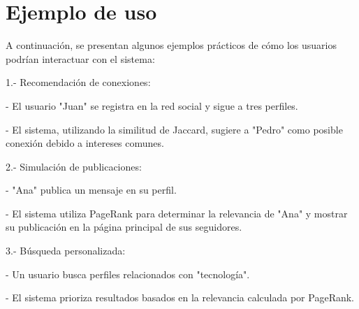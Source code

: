 \section{Ejemplo de uso}
A continuación, se presentan algunos ejemplos prácticos de cómo los usuarios podrían interactuar con el sistema:

1.- Recomendación de conexiones:

\hspace{1cm}- El usuario "Juan" se registra en la red social y sigue a tres perfiles.

\hspace{1cm}- El sistema, utilizando la similitud de Jaccard, sugiere a "Pedro" como posible conexión debido a intereses comunes.

2.- Simulación de publicaciones:

\hspace{1cm}- "Ana" publica un mensaje en su perfil.

\hspace{1cm}- El sistema utiliza PageRank para determinar la relevancia de "Ana" y mostrar su publicación en la página principal de sus seguidores.

3.- Búsqueda personalizada:

\hspace{1cm}- Un usuario busca perfiles relacionados con "tecnología".

\hspace{1cm}- El sistema prioriza resultados basados en la relevancia calculada por PageRank.
